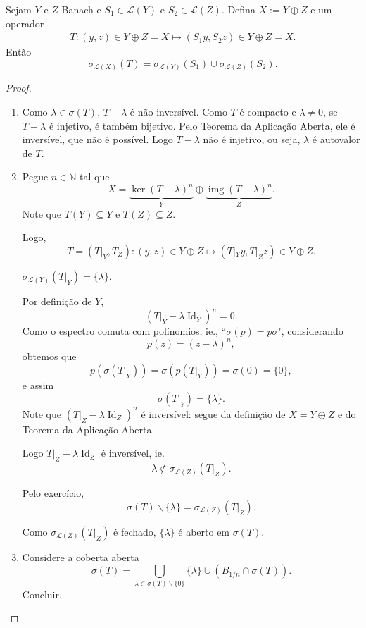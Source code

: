 \documentclass[portuguese]{article}
\theoremstyle{definition}
\newcommand{\N}{\mathbb{N}}
\DeclareMathOperator{\img}{img}
\DeclareMathOperator{\Id}{Id}
\begin{document}
\begin{exer*}
	Sejam $Y$ e $Z$ Banach e $S_1\in\mathcal{L}(Y)$ e $S_2\in\mathcal{L}(Z)$. Defina $X:=Y\oplus Z$ e um operador
	\begin{align*}
		T:(y,z)\in Y\oplus Z=X\mapsto(S_1y,S_2z)\in Y\oplus Z=X.
	\end{align*}
	Então
	\[\sigma_{\mathcal{L}(X)}(T)=\sigma_{\mathcal{L}(Y)}(S_1)\cup\sigma_{\mathcal{L}(Z)}(S_2).\]
\end{exer*}
\begin{proof}\leavevmode
	\begin{enumerate}
		\item Como $\lambda\in\sigma(T)$, $T-\lambda$ é não inversível. Como $T$ é compacto e $\lambda\neq0$, se $T-\lambda$ é injetivo, é também bijetivo. Pelo Teorema da Aplicação Aberta, ele é inversível, que não é possível. Logo $T-\lambda$ não é injetivo, ou seja, $\lambda$ é autovalor de $T$.
		
		\item Pegue $n\in\N$ tal que
		\[X=\underbrace{\ker(T-\lambda)^n}_Y\oplus\underbrace{\img(T-\lambda)^n}_Z.\]
		Note que $T(Y)\subseteq Y$ e $T(Z)\subseteq Z$.
		
		Logo,
		\[T=(T|_Y,T_Z):(y,z)\in Y\oplus Z\mapsto(T|_Yy,T|_Zz)\in Y\oplus Z.\]
		
		\begin{af*}
			$\sigma_{\mathcal{L}(Y)}(T|_Y)=\{\lambda\}$.
		\end{af*}
		Por definição de $Y$,
		\[(T|_Y-\lambda\Id_Y)^n=0.\]
		Como o espectro comuta com polínomios, ie., ``$\sigma(p)=p\sigma$", considerando
		\[p(z)=(z-\lambda)^n,\]
		obtemos que
		\[p(\sigma(T|_Y))=\sigma(p(T|_Y))=\sigma(0)=\{0\},\]
		e assim
		\[\sigma(T|_Y)=\{\lambda\}.\]
		Note que $(T|_Z-\lambda\Id_Z)^n$ é inversível: segue da definição de $X=Y\oplus Z$ e do Teorema da Aplicação Aberta.
		
		Logo $T|_Z-\lambda\Id_Z$ é inversível, ie.
		\[\lambda\notin\sigma_{\mathcal{L}(Z)}(T|_Z).\]
		
		Pelo exercício,
		\[\sigma(T)\backslash\{\lambda\}=\sigma_{\mathcal{L}(Z)}(T|_Z).\]
		
		Como $\sigma_{\mathcal{L}(Z)}(T|_Z)$ é fechado, $\{\lambda\}$ é aberto em $\sigma(T)$.
		
		\item Considere a coberta aberta
		\[\sigma(T)=\bigcup_{\lambda\in\sigma(T)\backslash\{0\}}\{\lambda\}\cup(B_{1/n}\cap\sigma(T)).\]
		{\color{orange}Concluir.}
	\end{enumerate}
\end{proof}
	\clearpage
	\iffalse
\end{document}
